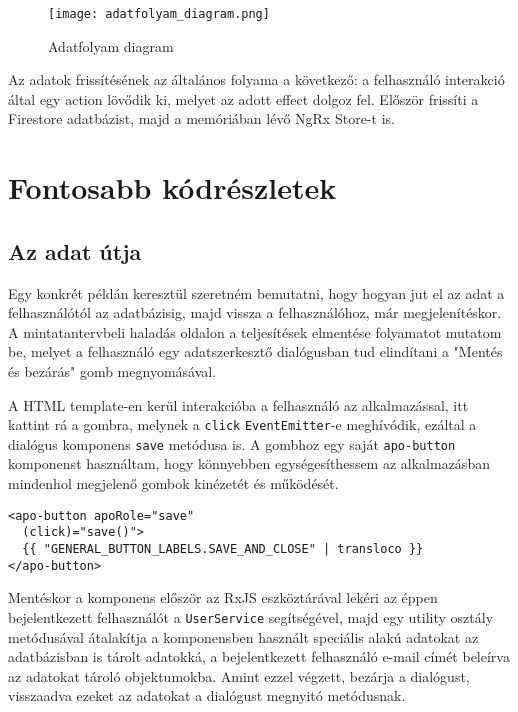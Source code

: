 \documentclass[a4paper,12pt]{report}
\begin{document}
\begin{figure}
    \centering
    \texttt{[image: adatfolyam\_diagram.png]}
    \caption{Adatfolyam diagram}
    \label{fig:data_flow_diagram}
\end{figure}

Az adatok frissítésének az általános folyama a következő: a felhasználó interakció által egy action lövődik ki, melyet az adott effect dolgoz fel. Először frissíti a Firestore adatbázist, majd a memóriában lévő NgRx Store-t is.

\section{Fontosabb kódrészletek}

\subsection{Az adat útja}

Egy konkrét példán keresztül szeretném bemutatni, hogy hogyan jut el az adat a felhasználótól az adatbázisig, majd vissza a felhasználóhoz, már megjelenítéskor. A mintatantervbeli haladás oldalon a teljesítések elmentése folyamatot mutatom be, melyet a felhasználó egy adatszerkesztő dialógusban tud elindítani a "Mentés és bezárás" gomb megnyomásával.

A HTML template-en kerül interakcióba a felhasználó az alkalmazással, itt kattint rá a gombra, melynek a \verb|click| \verb|EventEmitter|-e meghívódik, ezáltal a dialógus komponens \verb|save| metódusa is. A gombhoz egy saját \verb|apo-button| komponenst használtam, hogy könnyebben egységesíthessem az alkalmazásban mindenhol megjelenő gombok kinézetét és működését.

\pagebreak
\begin{samepage}
    \begin{verbatim}
<apo-button apoRole="save"
  (click)="save()">
  {{ "GENERAL_BUTTON_LABELS.SAVE_AND_CLOSE" | transloco }}
</apo-button>
    \end{verbatim}
\end{samepage}

Mentéskor a komponens először az RxJS eszköztárával lekéri az éppen bejelentkezett felhasználót a \verb|UserService| segítségével, majd egy utility osztály metódusával átalakítja a komponensben használt speciális alakú adatokat az adatbázisban is tárolt adatokká, a bejelentkezett felhasználó e-mail címét beleírva az adatokat tároló objektumokba. Amint ezzel végzett, bezárja a dialógust, visszaadva ezeket az adatokat a dialógust megnyitó metódusnak.
\end{document}
